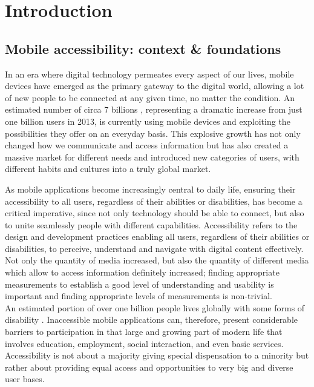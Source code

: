 \chapter{Introduction}
\label{chap:intro}


\section{Mobile accessibility: context \& foundations}
\label{chap:intro-background}

In an era where digital technology permeates every aspect of our lives, mobile devices have emerged as the primary gateway to the digital world, allowing a lot of new people to be connected at any given time, no matter the condition. An estimated number of circa 7 billions \cite{article:number-of-users}, representing a dramatic increase from just one billion users in 2013, is currently using mobile devices and exploiting the possibilities they offer on an everyday basis. This explosive growth has not only changed how we communicate and access information but has also created a massive market for different needs and introduced new categories of users, with different habits and cultures into a truly global market.

As mobile applications become increasingly central to daily life, ensuring their accessibility to all users, regardless of their abilities or disabilities, has become a critical imperative, since not only technology should be able to connect, but also to unite seamlessly people with different capabilities. Accessibility refers to the design and development practices enabling all users, regardless of their abilities or disabilities, to perceive, understand and navigate with digital content effectively. Not only the quantity of media increased, but also the quantity of different media which allow to access information definitely increased; finding appropriate measurements to establish a good level of understanding and usability is important and finding appropriate levels of measurements is non-trivial. \\

An estimated portion of over one billion people lives globally with some forms of disability \cite{article:who-disability}. Inaccessible mobile applications can, therefore, present considerable barriers to participation in that large and growing part of modern life that involves education, employment, social interaction, and even basic services. Accessibility is not about a majority giving special dispensation to a minority but rather about providing equal access and opportunities to very big and diverse user bases.

